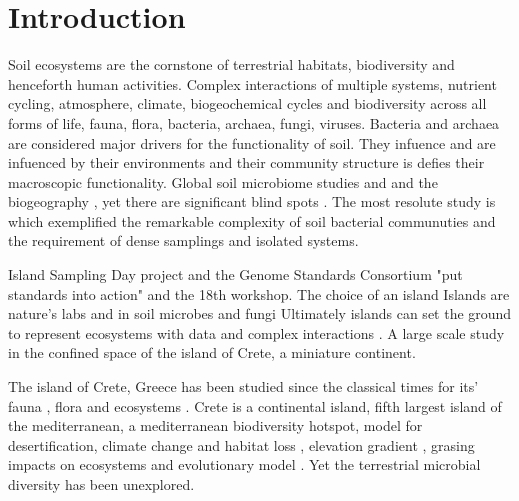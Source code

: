 \documentclass[unnumsec,webpdf,contemporary,large]{oup-authoring-template}%
\theoremstyle{thmstyleone}%
\theoremstyle{thmstyletwo}%
\theoremstyle{thmstylethree}%
\begin{document}


\maketitle


\section{Introduction}\label{intro}

Soil ecosystems are the cornstone of terrestrial habitats, biodiversity and henceforth human activities.
Complex interactions of multiple systems, nutrient cycling, atmosphere, climate, biogeochemical cycles and biodiversity 
across all forms of life, fauna, flora, bacteria, archaea, fungi, viruses. 
Bacteria and archaea are considered major drivers for the functionality of soil.
They infuence and are infuenced by their environments and their community structure 
is defies their macroscopic functionality.
Global soil microbiome studies \citep{Delgado-Baquerizo2018} and \citep{Bahram2018} and the biogeography \citep{Martiny2006} \citep{Guerra2020}, \citep{Labouyrie2023} yet there are significant blind spots \citep{Guerra2020}. The most resolute study is \citep{Karimi2020} which exemplified the 
remarkable complexity of soil bacterial communuties and the requirement of  dense samplings and isolated systems. 

Island Sampling Day project and the 
Genome Standards Consortium \citep{Field2011} "put standards into action" and the 
18th workshop. 
The choice of an island
Islands are nature's labs \citep{Whittaker2017} and in soil microbes \citep{Li2020} and fungi \citep{Delavaux2021}
Ultimately islands can set the ground to represent ecosystems with data and complex interactions \citep{Davies2016}.
A large scale study in the confined space of the island of Crete, a miniature continent.


The island of Crete, Greece has been studied since the classical times for its' fauna \citep{Sidiropoulos_Polymeni_Legakis_2017,Anastasiou2018Tenebrionid}, flora \citep{Krimbas_2005} and ecosystems \citep{Grove1993}.
Crete is a continental island, fifth largest island of the mediterranean, a mediterranean biodiversity hotspot, model for desertification, climate change \citep{Kougioumoutzis2020} and habitat loss \citep{ISPIKOUDIS1993259},
elevation gradient \citep{trigas2013, FAZAN2017}, grasing impacts on ecosystems \citep{JouffroyBapicot2016} and evolutionary model \citep{POULAKAKIS2002}.
Yet the terrestrial microbial diversity has been unexplored.
\end{document}
